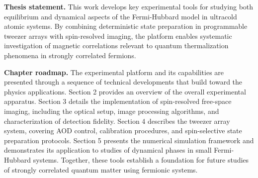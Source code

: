 \textbf{Thesis statement.} This work develops key experimental tools for studying both equilibrium and dynamical aspects of the Fermi-Hubbard model in ultracold atomic systems. By combining deterministic state preparation in programmable tweezer arrays with spin-resolved imaging, the platform enables systematic investigation of magnetic correlations relevant to quantum thermalization phenomena in strongly correlated fermions.

\textbf{Chapter roadmap.} The experimental platform and its capabilities are presented through a sequence of technical developments that build toward the physics applications. Section 2 provides an overview of the overall experimental apparatus. Section 3 details the implementation of spin-resolved free-space imaging, including the optical setup, image processing algorithms, and characterization of detection fidelity. Section 4 describes the tweezer array system, covering AOD control, calibration procedures, and spin-selective state preparation protocols. Section 5 presents the numerical simulation framework and demonstrates its application to studies of dynamical phases in small Fermi-Hubbard systems. Together, these tools establish a foundation for future studies of strongly correlated quantum matter using fermionic systems.